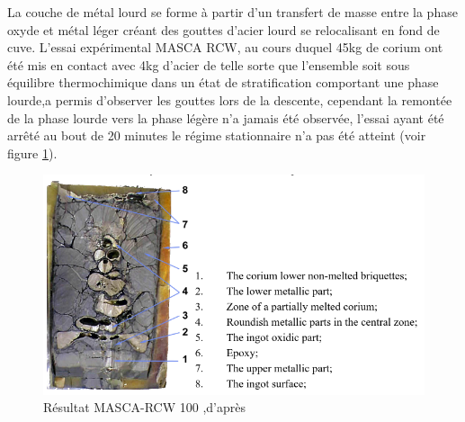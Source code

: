  

La couche de métal lourd se forme à partir d'un transfert de masse entre la phase oxyde et métal léger créant des gouttes d'acier lourd se relocalisant en fond de cuve. L'essai expérimental MASCA RCW, au cours duquel 45kg de corium ont été mis en contact avec 4kg d'acier de telle sorte que l'ensemble soit sous équilibre thermochimique dans un état de stratification comportant une phase lourde,a permis d'observer les gouttes lors de la descente, cependant la remontée de la phase lourde vers la phase légère n'a jamais été observée, l'essai ayant été arrêté au bout de 20 minutes le régime stationnaire n'a pas été atteint (voir figure \ref{fig:masca}).
 \begin{figure}[H]
	\centering
	\includegraphics[width=0.7\linewidth]{figure/masca}
	\caption[Résultat MASCA-RCW 100]{Résultat MASCA-RCW 100 ,d'après \cite{}}
	\label{fig:masca}
\end{figure}


